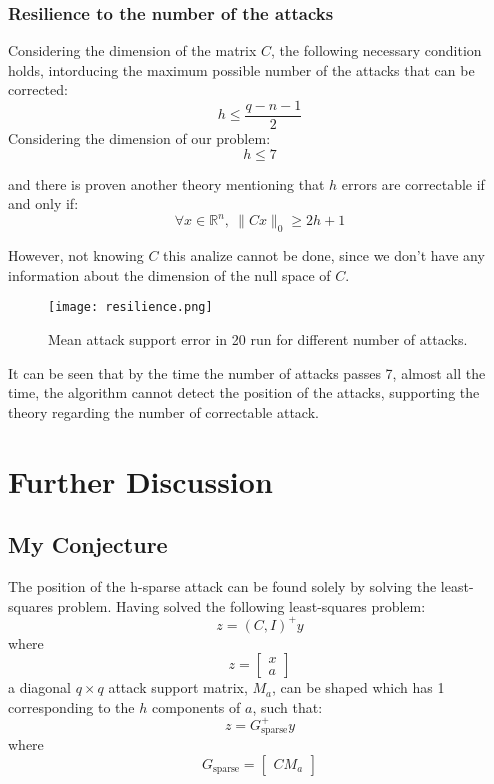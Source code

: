 \subsubsection{Resilience to the number of the attacks}
Considering the dimension of the matrix $C$, the following necessary condition holds, intorducing the maximum possible number of the attacks that can be corrected:
\begin{equation}
h \leq \frac{q - n -1}{2}
\end{equation}
Considering the dimension of our problem:
\[
h \leq 7
\]

and there is proven another theory mentioning that $h$ errors are correctable if and only if:
\begin{equation}
\forall x \in \mathbb{R}^n, \ \|Cx\|_0 \geq 2h + 1
\end{equation}

However, not knowing $C$ this analize cannot be done, since we don't have any information about the dimension of the null space of $C$.

\begin{figure}[H] %
    \centering
    \texttt{[image: resilience.png]} %
    \caption{Mean attack support error in 20 run for different number of attacks.}
    \label{fig:example}
\end{figure}

It can be seen that by the time the number of attacks passes 7, almost all the time, the algorithm cannot detect the position of the attacks, supporting the theory regarding the number of correctable attack.
\section{Further Discussion}
\subsection{My Conjecture}
The position of the h-sparse attack can be found solely by solving the least-squares problem. Having solved the following least-squares problem:
\begin{equation}
    z = (C, I)^{+} y
\end{equation}
where
\begin{equation}
    z = 
    \begin{bmatrix}
        x \\
        a
    \end{bmatrix}
\end{equation}
a diagonal \( q \times q \) attack support matrix, \( M_a \), can be shaped which has 1 corresponding to the \( h \) components of \( a \), such that:
\begin{equation}
    z = G_{\text{sparse}}^{+} y
\end{equation}
where
 \begin{equation}
    G_{\text{sparse}} = 
    \begin{bmatrix}
        C M_a
    \end{bmatrix}
\end{equation} 

